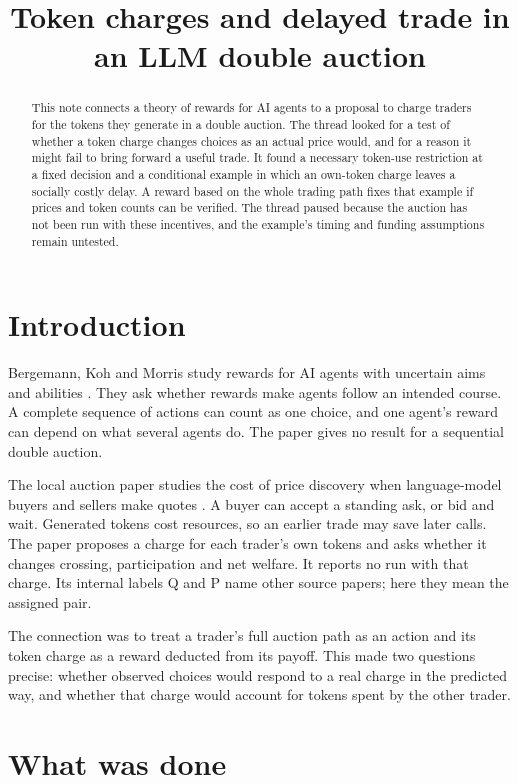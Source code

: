 \documentclass{article}
\title{Token charges and delayed trade in an LLM double auction}
\begin{document}
\maketitle

\begin{abstract}
This note connects a theory of rewards for AI agents to a proposal to charge traders for the tokens
they generate in a double auction. The thread looked for a test of whether a token charge changes
choices as an actual price would, and for a reason it might fail to bring forward a useful trade. It
found a necessary token-use restriction at a fixed decision and a conditional example in which an
own-token charge leaves a socially costly delay. A reward based on the whole trading path fixes that
example if prices and token counts can be verified. The thread paused because the auction has not
been run with these incentives, and the example's timing and funding assumptions remain untested.
\end{abstract}

\section{Introduction}

Bergemann, Koh and Morris study rewards for AI agents with uncertain aims and abilities \cite{Q}.
They ask whether rewards make agents follow an intended course. A complete sequence of actions can
count as one choice, and one agent's reward can depend on what several agents do. The paper gives no
result for a sequential double auction.

The local auction paper studies the cost of price discovery when language-model buyers and sellers
make quotes \cite{P}. A buyer can accept a standing ask, or bid and wait. Generated tokens cost
resources, so an earlier trade may save later calls. The paper proposes a charge for each trader's
own tokens and asks whether it changes crossing, participation and net welfare. It reports no run
with that charge. Its internal labels Q and P name other source papers; here they mean the assigned
pair.

The connection was to treat a trader's full auction path as an action and its token charge as a
reward deducted from its payoff. This made two questions precise: whether observed choices would
respond to a real charge in the predicted way, and whether that charge would account for tokens
spent by the other trader.

\section{What was done}
\end{document}
